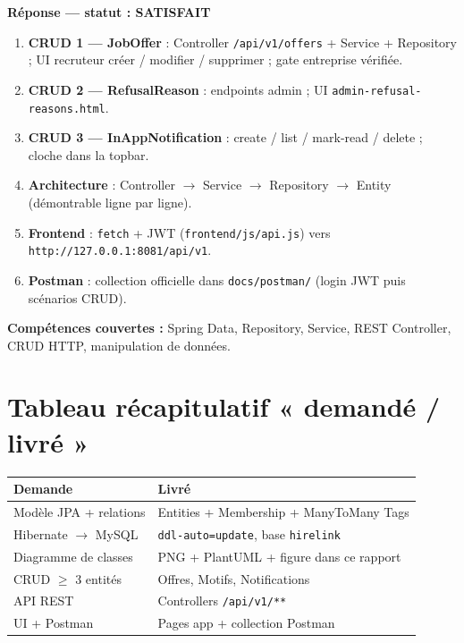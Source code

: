 \documentclass[11pt,a4paper,oneside]{report}
\begin{document}
\begin{okbox}
\textbf{Réponse --- statut : SATISFAIT}
\begin{enumerate}[leftmargin=1.3em]
  \item \textbf{CRUD 1 --- JobOffer} : Controller \texttt{/api/v1/offers} + Service + Repository ; UI recruteur créer / modifier / supprimer ; gate entreprise vérifiée.
  \item \textbf{CRUD 2 --- RefusalReason} : endpoints admin ; UI \texttt{admin-refusal-reasons.html}.
  \item \textbf{CRUD 3 --- InAppNotification} : create / list / mark-read / delete ; cloche dans la topbar.
  \item \textbf{Architecture} : Controller $\rightarrow$ Service $\rightarrow$ Repository $\rightarrow$ Entity (démontrable ligne par ligne).
  \item \textbf{Frontend} : \texttt{fetch} + JWT (\texttt{frontend/js/api.js}) vers \texttt{http://127.0.0.1:8081/api/v1}.
  \item \textbf{Postman} : collection officielle dans \texttt{docs/postman/} (login JWT puis scénarios CRUD).
\end{enumerate}
\end{okbox}

\textbf{Compétences couvertes :} Spring Data, Repository, Service, REST Controller, CRUD HTTP, manipulation de données.

\section*{Tableau récapitulatif « demandé / livré »}
\begin{tabularx}{\textwidth}{@{}p{4.2cm}X@{}}
\toprule
\textbf{Demande} & \textbf{Livré} \\
\midrule
Modèle JPA + relations & Entities + Membership + ManyToMany Tags \\
Hibernate $\rightarrow$ MySQL & \texttt{ddl-auto=update}, base \texttt{hirelink} \\
Diagramme de classes & PNG + PlantUML + figure dans ce rapport \\
CRUD $\ge$ 3 entités & Offres, Motifs, Notifications \\
API REST & Controllers \texttt{/api/v1/**} \\
UI + Postman & Pages app + collection Postman \\
\bottomrule
\end{tabularx}

\end{document}
